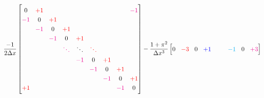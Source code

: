 \newcommand\cc{\color{blue}}
\newcommand\cd{\color{cyan}}
\begin{equation*}
\renewcommand{\arraystretch}{1.25} %
\renewcommand{\arraycolsep}{4.5pt} %
\frac{-1}{2 \Delta x}
\begin{bmatrix}
0           & \ca +1   &             &             &             &             &             &             & \cb -1      \\
\cb -1      & 0        & \ca +1      &             &             &             &             &             &             \\
            & \cb -1   & 0           & \ca +1      &             &             &             &             &             \\
            &          & \cb -1      & 0           & \ca +1      &             &             &             &             \\
            &          &             & \cb \ddots  & \ddots      & \ca \ddots  &             &             &             \\
            &          &             &             & \cb -1      & 0           & \ca +1      &             &             \\
            &          &             &             &             & \cb -1      & 0           & \ca +1      &             \\
            &          &             &             &             &             & \cb -1      & 0           & \ca +1      \\
\ca +1      &          &             &             &             &             &             & \cb -1      & 0           \\
\end{bmatrix}
-\frac{1+\pi^2}{\Delta x^3}
\begin{bmatrix}
0           & \ca -3      & 0           & \cc +1      &             &             & \cd -1      & 0           & \cb +3      \\

\end{bmatrix}
\end{equation*}

